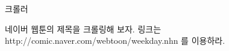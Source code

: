 \documentclass{beamer}
\begin{document}
\begin{frame}[allowframebreaks]{크롤러} 

네이버 웹툰의 제목을 크롤링해 보자. 링크는 http://comic.naver.com/webtoon/weekday.nhn 를 이용하라. 

\end{frame}










\end{document}
